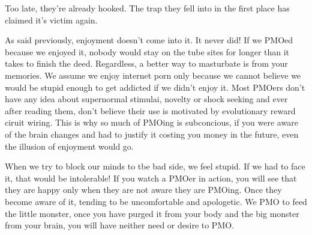 \documentclass[easypeasy.tex]{subfiles}
\begin{document}
Too late, they're already hooked. The trap they fell into in the first place has claimed it's victim again.

As said previously, enjoyment doesn't come into it. It never did! If we PMOed because we enjoyed it, nobody would stay on the tube sites for longer than it takes to finish the deed. Regardless, a better way to masturbate is from your memories. We assume we enjoy internet porn only because we cannot believe we would be stupid enough to get addicted if we didn't enjoy it. Most PMOers don't have any idea about supernormal stimulai, novelty or shock seeking and ever after reading them, don't believe their use is motivated by evolutionary reward ciruit wiring. This is why so much of PMOing is subconcious, if you were aware of the brain changes and had to justify it costing you money in the future, even the illusion of enjoyment would go.

When we try to block our minds to tbe bad side, we feel stupid. If we had to face it, that would be intolerable! If you watch a PMOer in action, you will see that they are happy only when they are not aware they are PMOing. Once they become aware of it, tending to be uncomfortable and apologetic. We PMO to feed the little monster, once you have purged it from your body and the big monster from your brain, you will have neither need or desire to PMO.
\end{document}

